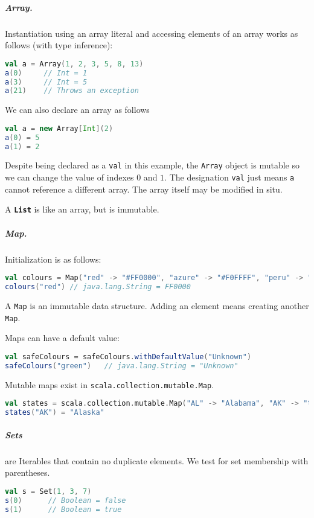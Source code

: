 \subparagraph{Array.} Instantiation using an array literal and accessing elements of an array works as follows (with type inference):
\begin{lstlisting}[language=scala, style=snippet]
val a = Array(1, 2, 3, 5, 8, 13)
a(0)     // Int = 1
a(3)     // Int = 5
a(21)    // Throws an exception
\end{lstlisting}
We can also declare an array as follows
\begin{lstlisting}[language=scala, style=snippet]
val a = new Array[Int](2)
a(0) = 5
a(1) = 2
\end{lstlisting}
Despite being declared as a \texttt{val} in this example, the \texttt{Array} object is mutable so we can change the value of indexes $0$ and $1$. The designation \texttt{val} just means \texttt{a} cannot reference a different array. The array itself may be modified in situ.

A \textbf{\texttt{List}} is like an array, but is immutable.

\subparagraph{Map.} Initialization is as follows:
\begin{lstlisting}[language=scala, style=snippet]
val colours = Map("red" -> "#FF0000", "azure" -> "#F0FFFF", "peru" -> "#CD853F")
colours("red") // java.lang.String = FF0000
\end{lstlisting}
A \texttt{Map} is an immutable data structure. Adding an element means creating another \texttt{Map}.

Maps can have a default value:
\begin{lstlisting}[language=scala, style=snippet]
val safeColours = safeColours.withDefaultValue("Unknown")
safeColours("green")   // java.lang.String = "Unknown"
\end{lstlisting}

Mutable maps exist in \texttt{scala.collection.mutable.Map}.
\begin{lstlisting}[language=scala, style=snippet]
val states = scala.collection.mutable.Map("AL" -> "Alabama", "AK" -> "tobedefined")
states("AK") = "Alaska"
\end{lstlisting}

\subparagraph{Sets} are Iterables that contain no duplicate elements. We test for set membership with parentheses.
\begin{lstlisting}[language=scala, style=snippet]
val s = Set(1, 3, 7)
s(0)      // Boolean = false
s(1)      // Boolean = true
\end{lstlisting}

